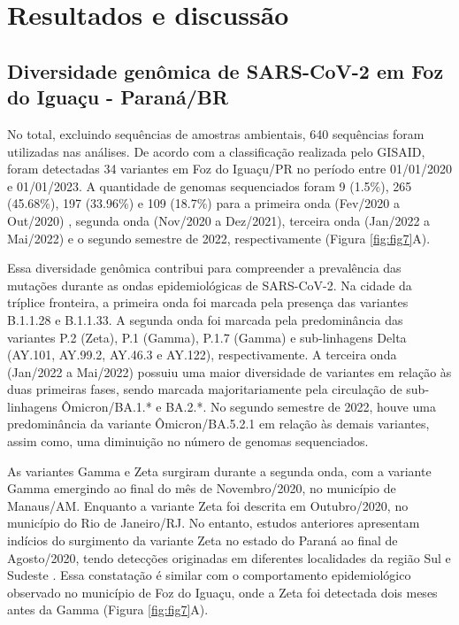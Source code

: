 \chapter{Resultados e discussão}

\begin{justifying}
\section{Diversidade genômica de SARS-CoV-2 em Foz do Iguaçu - Paraná/BR}

No total, excluindo sequências de amostras ambientais, 640 sequências foram utilizadas nas análises. De acordo com a classificação realizada pelo GISAID, foram detectadas 34 variantes em Foz do Iguaçu/PR no período entre 01/01/2020 e 01/01/2023. A quantidade de genomas sequenciados foram 9 (1.5\%), 265 (45.68\%), 197 (33.96\%) e 109 (18.7\%) para a primeira onda (Fev/2020 a Out/2020) , segunda onda (Nov/2020 a Dez/2021), terceira onda (Jan/2022 a Mai/2022) e o segundo semestre de 2022, respectivamente (Figura \ref{fig:fig7}A). 

Essa diversidade genômica contribui para compreender a prevalência das mutações durante as ondas epidemiológicas de SARS-CoV-2. Na cidade da tríplice fronteira, a primeira onda foi marcada pela presença das variantes B.1.1.28 e B.1.1.33. A segunda onda foi marcada pela predominância das variantes P.2 (Zeta), P.1 (Gamma), P.1.7 (Gamma) e sub-linhagens Delta (AY.101, AY.99.2, AY.46.3 e AY.122), respectivamente. A terceira onda  (Jan/2022 a Mai/2022) possuiu uma maior diversidade de variantes em relação às duas primeiras fases, sendo marcada majoritariamente pela circulação de sub-linhagens Ômicron/BA.1.* e BA.2.*. No segundo semestre de 2022, houve uma predominância da variante Ômicron/BA.5.2.1 em relação às demais variantes, assim como, uma diminuição no número de genomas sequenciados.

As variantes Gamma e Zeta surgiram durante a segunda onda, com a variante Gamma emergindo ao final do mês de Novembro/2020, no município de Manaus/AM. Enquanto a variante Zeta foi descrita em Outubro/2020, no município do Rio de Janeiro/RJ. No entanto, estudos anteriores apresentam indícios do surgimento da variante Zeta no estado do Paraná ao final de Agosto/2020, tendo detecções originadas em diferentes localidades da região Sul e Sudeste \cite{Faria:2021, Giovanetti:2022}. Essa constatação é similar com o comportamento epidemiológico observado no município de Foz do Iguaçu, onde a Zeta foi detectada dois meses antes da Gamma (Figura \ref{fig:fig7}A).


\end{justifying}

